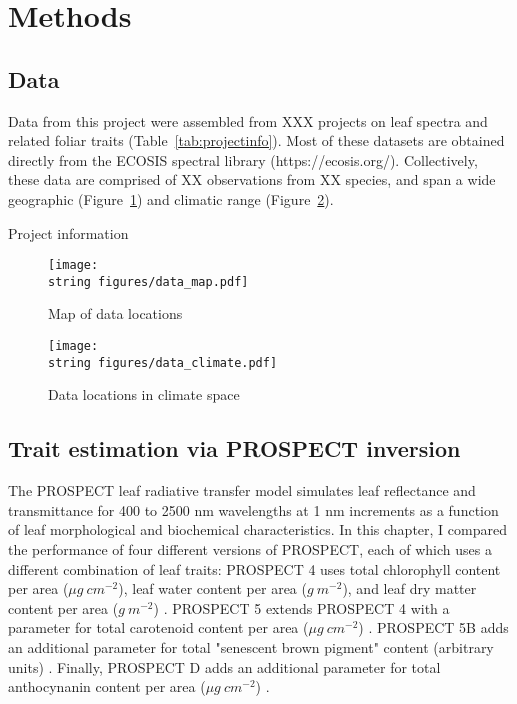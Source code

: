 \section{Methods}

\subsection{Data}

Data from this project were assembled from XXX projects on leaf spectra and related foliar traits (Table~\ref{tab:projectinfo}).
Most of these datasets are obtained directly from the ECOSIS spectral library (https://ecosis.org/).
Collectively, these data are comprised of XX observations from XX species, and span a wide geographic (Figure~\ref{fig:datamap}) and climatic range (Figure~\ref{fig:dataclimate}).

\begin{table}
    \caption{Project information}
    \centering
    
    \label{tab:projectinfo}
\end{table}

\begin{figure}
    \texttt{[image: \\string figures/data\_map.pdf]}
    \caption{Map of data locations}
    \label{fig:datamap}
\end{figure}

\begin{figure}
    \texttt{[image: \\string figures/data\_climate.pdf]}
    \caption{Data locations in climate space}
    \label{fig:dataclimate}
\end{figure}

\subsection{Trait estimation via PROSPECT inversion}

The PROSPECT leaf radiative transfer model \cite{jacquemoud1990_prospect,jacquemoud_2009_prosail,feret2008_prospect,feret2017_prospectd} simulates leaf reflectance and transmittance for 400 to 2500 nm wavelengths at 1 nm increments as a function of leaf morphological and biochemical characteristics.
In this chapter, I compared the performance of four different versions of PROSPECT, each of which uses a different combination of leaf traits:
PROSPECT 4 uses
total chlorophyll content per area ($\mu g ~ cm^{-2}$),
leaf water content per area ($g ~ m^{-2}$),
and leaf dry matter content per area ($g ~ m^{-2}$) \cite{feret2008_prospect}.
PROSPECT 5 extends PROSPECT 4 with a parameter for
total carotenoid content per area ($\mu g ~ cm^{-2}$) \cite{feret2008_prospect}.
PROSPECT 5B adds an additional parameter for
total "senescent brown pigment" content (arbitrary units) \cite{jacquemoud_2009_prosail}.
Finally, PROSPECT D adds an additional parameter for
total anthocynanin content per area ($\mu g ~ cm^{-2}$) \cite{feret2017_prospectd}.

